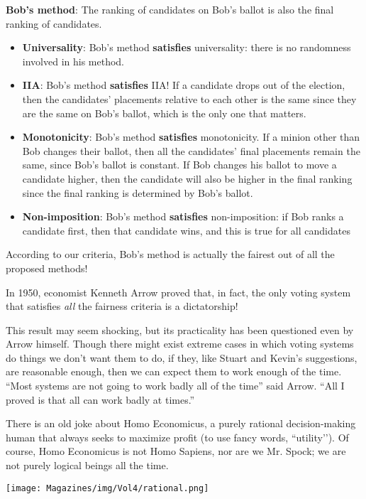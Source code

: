 \documentclass{article}
\begin{document}
\begin{multicols}{3}
\textbf{Bob’s method}: The ranking of candidates on Bob’s ballot is also the final ranking of candidates. 
\begin{itemize}
	\item \textbf{Universality}: Bob’s method {\textbf{satisfies}} universality: there is no randomness involved in his method.
	\item \textbf{IIA}: Bob’s method {\textbf{satisfies}} IIA! If a candidate drops out of the election, then the candidates’ placements relative to each other is the same since they are the same on Bob’s ballot, which is the only one that matters.
	\item \textbf{Monotonicity}: Bob’s method {\textbf{satisfies}} monotonicity. If a minion other than Bob changes their ballot, then all the candidates’ final placements remain the same, since Bob’s ballot is constant. If Bob changes his ballot to move a candidate higher, then the candidate will also be higher in the final ranking since the final ranking is determined by Bob’s ballot. 
	\item \textbf{Non-imposition}: Bob’s method {\textbf{satisfies}} non-imposition: if Bob ranks a candidate first, then that candidate wins, and this is true for all candidates
\end{itemize}

According to our criteria, Bob’s method is actually the fairest out of all the proposed methods! 

In 1950, economist Kenneth Arrow proved that, in fact, the only voting system that satisfies \textit{all} the fairness criteria is a dictatorship! 

This result may seem shocking, but its practicality has been questioned even by Arrow himself. Though there might exist extreme cases in which voting systems do things we don’t want them to do, if they, like Stuart and Kevin’s suggestions, are reasonable enough, then we can expect them to work enough of the time. ``Most systems are not going to work badly all of the time” said Arrow. ``All I proved is that all can work badly at times.”

\closearticle

There is an old joke about Homo Economicus, a purely rational decision-making human that always seeks to maximize profit (to use fancy words, ``utility’’).
Of course, Homo Economicus is not Homo Sapiens, nor are we Mr. Spock; we are not purely logical beings all the time.
\begin{center}
    \texttt{[image: Magazines/img/Vol4/rational.png]}
\end{center}


\end{multicols}
\end{document}
